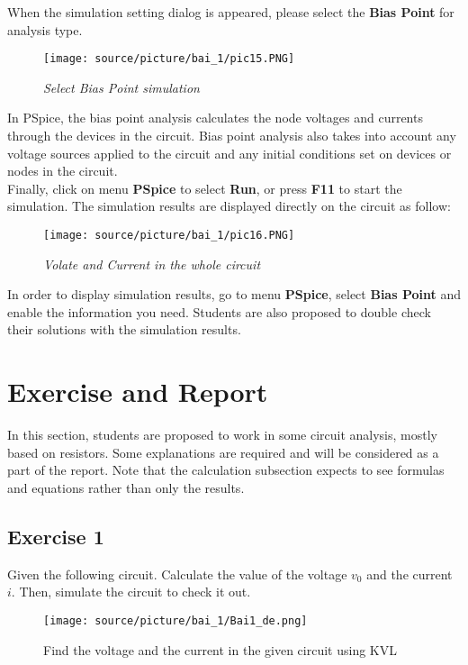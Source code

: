 When the simulation setting dialog is appeared, please select the \textbf{Bias Point} for analysis type. 
\begin{figure}[!htp]
    \centering
    \texttt{[image: source/picture/bai\_1/pic15.PNG]}
    \caption{\textit{Select Bias Point simulation}}
    \label{bai1_pic15}
\end{figure}

In PSpice, the bias point analysis calculates the node voltages and currents through the devices in the circuit. Bias point analysis also takes into account any voltage sources applied to the circuit and any initial conditions set on devices or nodes in the circuit. \\

Finally, click on menu \textbf{PSpice} to select \textbf{Run}, or press \textbf{F11} to start the simulation. The simulation results are displayed directly on the circuit as follow:

\begin{figure}[!htp]
    \centering
    \texttt{[image: source/picture/bai\_1/pic16.PNG]}
    \caption{\textit{Volate and Current in the whole circuit}}
    \label{bai1_pic16}
\end{figure}

In order to display simulation results, go to menu \textbf{PSpice}, select \textbf{Bias Point} and enable the information you need. Students are also proposed to double check their solutions with the simulation results.

\def\answer{1}
\section{Exercise and Report}
In this section, students are proposed to work in some circuit analysis, mostly based on resistors. Some explanations are required and will be considered as a part of the report. Note that the calculation subsection expects to see formulas and equations rather than only the results.

\subsection{Exercise 1}
Given the following circuit. Calculate the value of the voltage $v_0$ and the current $i$. Then, simulate the circuit to check it out.

\begin{figure}[!htp]
    \centering
    \texttt{[image: source/picture/bai\_1/Bai1\_de.png]}
    \caption{Find the voltage and the current in the given circuit using KVL}
    \label{lab1_ex1_de}
\end{figure}

